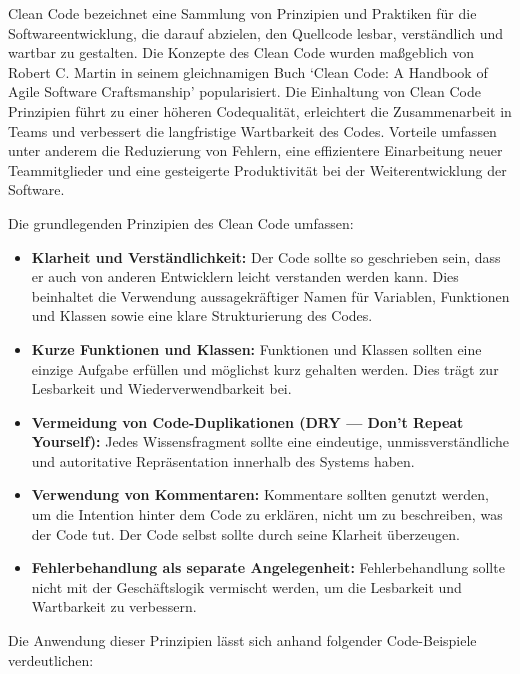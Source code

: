 \documentclass[../main.tex]{subfiles} %
\begin{document}
Clean Code bezeichnet eine Sammlung von Prinzipien und Praktiken für die Softwareentwicklung, die darauf abzielen, den Quellcode lesbar, verständlich und wartbar
zu gestalten. Die Konzepte des Clean Code wurden maßgeblich von Robert C. Martin in seinem gleichnamigen Buch `Clean Code: A Handbook of Agile Software Craftsmanship'
popularisiert. Die Einhaltung von Clean Code Prinzipien führt zu einer höheren Codequalität, erleichtert die Zusammenarbeit in Teams und verbessert die langfristige
Wartbarkeit des Codes. Vorteile umfassen unter anderem die Reduzierung von Fehlern, eine effizientere Einarbeitung neuer Teammitglieder und eine gesteigerte
Produktivität bei der Weiterentwicklung der Software.

Die grundlegenden Prinzipien des Clean Code umfassen:

\begin{itemize}

	\item \textbf{Klarheit und Verständlichkeit:}
	      Der Code sollte so geschrieben sein, dass er auch von anderen Entwicklern leicht verstanden werden kann. Dies beinhaltet die Verwendung aussagekräftiger
	      Namen für Variablen, Funktionen und Klassen sowie eine klare Strukturierung des Codes.

	\item \textbf{Kurze Funktionen und Klassen:}
	      Funktionen und Klassen sollten eine einzige Aufgabe erfüllen und möglichst kurz gehalten werden. Dies trägt zur Lesbarkeit und Wiederverwendbarkeit bei.

	\item \textbf{Vermeidung von Code-Duplikationen (DRY --- Don't Repeat Yourself):}
	      Jedes Wissensfragment sollte eine eindeutige, unmissverständliche und autoritative Repräsentation innerhalb des Systems haben.

	\item \textbf{Verwendung von Kommentaren:}
	      Kommentare sollten genutzt werden, um die Intention hinter dem Code zu erklären, nicht um zu beschreiben, was der Code tut. Der Code selbst sollte durch
	      seine Klarheit überzeugen.

	\item \textbf{Fehlerbehandlung als separate Angelegenheit:}
	      Fehlerbehandlung sollte nicht mit der Ge\-schäfts\-logik vermischt werden, um die Lesbarkeit und Wartbarkeit zu verbessern.

\end{itemize}

Die Anwendung dieser Prinzipien lässt sich anhand folgender Code-Beispiele verdeutlichen:
\end{document}

